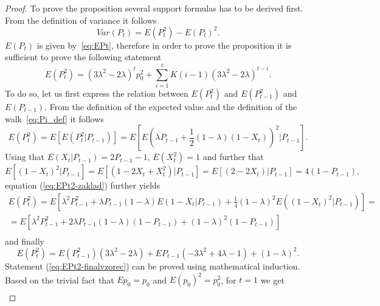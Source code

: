 \documentclass{amsart}
\theoremstyle{definition}
\theoremstyle{plain}
\theoremstyle{plain}
\theoremstyle{plain}
\numberwithin{equation}{section}
\begin{document}
    \begin{proof}
        To prove the proposition several support formulas has to be derived
        first.
        From the definition of variance it follows
        \begin{equation}
            Var(P_{t})=E(P_{t}^{2})-E(P_{t})^{2}.\label{eq:VarP-definition}
        \end{equation}
        $E(P_{t})$ is given by~\eqref{eq:EPt}, therefore in order to prove
        the proposition it is sufficient to prove the following statement
        \begin{equation}
            E(P_{t}^{2})=(3\lambda^{2}-2\lambda)^{t}p_{0}^{2}+\sum_{i=1}^{t}K(i-1)(3\lambda^{2}-2\lambda)^{t-i}.\label{eq:EPt2-finalvzorec}
        \end{equation}
        To do so, let us first express the relation between $E(P_{t}^{2})$
        and $E(P_{t-1}^{2})$ and $E(P_{t-1}).$ From the definition of the
        expected value and the definition of the walk~\eqref{eq:Pi_def} it follows
        \begin{equation}
            E(P_{t}^{2})=E[E(P_{t}^{2}|P_{t-1})]=E[E(\lambda P_{t-1}+\frac{1}{2}(1-\lambda)(1-X_{t}))^{2}|P_{t-1}].\label{eq:EPt2-zaklad}
        \end{equation}
        Using that $E(X_{t}|P_{t-1})=2P_{t-1}-1$, $E(X_{t}^{2})=1$ and further
        that
        \[
            E[(1-X_{t})^{2}|P_{t-1}]=E[(1-2X_{t}+X_{t}^{2})|P_{t-1}]
            =E[(2-2X_{t})|P_{t-1}]= 4(1-P_{t-1}),
        \]
        equation (\ref{eq:EPt2-zaklad}) further yields
        \begin{gather*}
            E(P_{t}^{2})=E[\lambda^{2}P_{t-1}^{2}+\lambda P_{t-1}(1-\lambda)E(1-X_{t}|P_{t-1})+\frac{1}{4}(1-\lambda)^{2}E((1-X_{t})^{2}|P_{t-1})]=\\
            =E[\lambda^{2}P_{t-1}^{2}+2\lambda P_{t-1}(1-\lambda)(1-P_{t-1})+(1-\lambda)^{2}(1-P_{t-1})]\\
        \end{gather*}
        and finally
        \begin{equation}
            E(P_{t}^{2})=E(P_{t-1}^{2})(3\lambda^{2}-2\lambda)+EP_{t-1}(-3\lambda^{2}+4\lambda-1)+(1-\lambda)^{2}.\label{eq:EPt2-pokrocile}
        \end{equation}
        Statement (\ref{eq:EPt2-finalvzorec}) can be proved using mathematical induction.
        Based on the trivial fact that $Ep_{0}=p_{0}$ and $E(p_{0})^{2}=p_{0}^{2}$,
        for $t=1$ we get
        \begin{gather*}

\end{gather*}
\end{proof}
\end{document}

